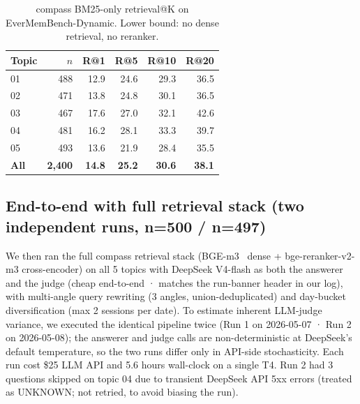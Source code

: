 \begin{table}[h]
\centering
\begin{tabular}{lrrrrr}
\toprule
Topic & $n$ & R@1 & R@5 & R@10 & R@20 \\
\midrule
01 & 488 & 12.9 & 24.6 & 29.3 & 36.5 \\
02 & 471 & 13.8 & 24.8 & 30.1 & 36.5 \\
03 & 467 & 17.6 & 27.0 & 32.1 & 42.6 \\
04 & 481 & 16.2 & 28.1 & 33.3 & 39.7 \\
05 & 493 & 13.6 & 21.9 & 28.4 & 35.5 \\
\midrule
\textbf{All} & \textbf{2{,}400} & \textbf{14.8} & \textbf{25.2} & \textbf{30.6} & \textbf{38.1} \\
\bottomrule
\end{tabular}
\caption{compass BM25-only retrieval@K on EverMemBench-Dynamic.
Lower bound: no dense retrieval, no reranker.}
\label{tab:em-bm25}
\end{table}

\subsection{End-to-end with full retrieval stack (two independent runs, n=500 / n=497)}
\label{sec:em-full-stack}

We then ran the full compass retrieval stack
(BGE-m3~\citep{chen2024bge} dense + bge-reranker-v2-m3 cross-encoder)
on all 5 topics with DeepSeek V4-flash as both the answerer and the
judge (cheap end-to-end · matches the run-banner header in our log),
with multi-angle query rewriting (3 angles,
union-deduplicated) and day-bucket diversification (max 2 sessions per
date). To estimate inherent LLM-judge variance, we executed the
identical pipeline twice (Run 1 on 2026-05-07 · Run 2 on 2026-05-08);
the answerer and judge calls are non-deterministic at DeepSeek's
default temperature, so the two runs differ only in API-side stochasticity.
Each run cost \$25 LLM API and 5.6 hours wall-clock on a single T4.
Run 2 had 3 questions skipped on topic 04 due to transient DeepSeek API
5xx errors (treated as UNKNOWN; not retried, to avoid biasing the run).

